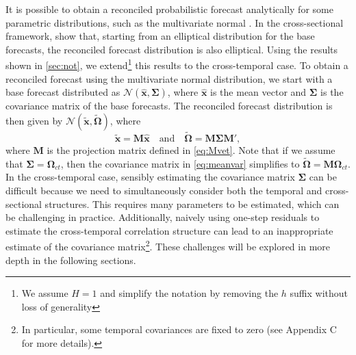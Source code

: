 \documentclass[a4paper,11pt]{article}
\newcommand{\xvet}{\bm{x}}
\newcommand{\Mvet}{\bm{M}}
\newcommand{\Omegavet}{\bm{\Omega}}
\newcommand{\Sigmavet}{\bm{\Sigma}}
\theoremstyle{definition}
\begin{document}
It is possible to obtain a reconciled probabilistic forecast analytically for some parametric distributions, such as the multivariate normal \citep{corani2021, eckert2021, panagiotelis2023, wickramasuriya2021b}. In the cross-sectional framework, \cite{panagiotelis2023} show that, starting from an elliptical distribution for the base forecasts, the reconciled forecast distribution is also elliptical. Using the results shown in \autoref{sec:not}, we extend\footnote{We assume $H =1$ and simplify the notation by removing the $h$ suffix without loss of generality} this results to the cross-temporal case. To obtain a reconciled forecast using the multivariate normal distribution, we start with a base forecast distributed as $\mathcal{N}(\widehat{\xvet}, \Sigmavet)$, where $\widehat{\xvet}$ is the mean vector and $\Sigmavet$ is the covariance matrix of the base forecasts. The reconciled forecast distribution is then given by $\mathcal{N}(\widetilde{\xvet}, \widetilde{\Omegavet})$, where
\begin{equation}\label{eq:meanvar}
	\widetilde{\xvet} = \Mvet\widehat{\xvet} \quad \mbox{and} \quad \widetilde{\Omegavet} = \Mvet \Sigmavet \Mvet',
\end{equation}
where $\Mvet$ is the projection matrix defined in \eqref{eq:Mvet}.
Note that if we assume that $\Sigmavet = \Omegavet_{ct}$, then the covariance matrix in \eqref{eq:meanvar} simplifies to $\widetilde{\Omegavet} = \Mvet \Omegavet_{ct}$. In the cross-temporal case, sensibly estimating the covariance matrix $\Sigmavet$ can be difficult because we need to simultaneously consider both the temporal and cross-sectional structures. This requires many parameters to be estimated, which can be challenging in practice. Additionally, naively using one-step residuals to estimate the cross-temporal correlation structure can lead to an inappropriate estimate of the covariance matrix\footnote{In particular, some temporal covariances are fixed to zero (see Appendix C for more details).}. These challenges will be explored in more depth in the following sections.


\end{document}
